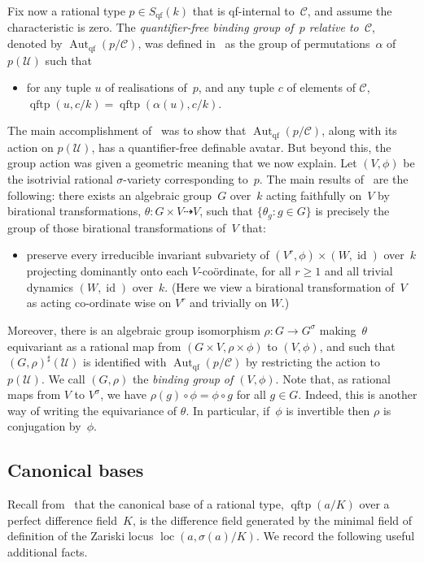 \documentclass[\DocOpts]{amsart}
\theoremstyle{definition}
\def\qftp{\operatorname{qftp}}
\def\qf{\operatorname{qf}}
\def\aut{\operatorname{Aut}}
\def\loc{\operatorname{loc}}
\def\C{\mathcal{C}}
\def\U{\mathcal{U}}
\providecommand{\id}{\operatorname{id}}
\newcommand{\ra}[1][]{\xrightarrow{#1}}
\newcommand{\shp}[1]{{#1}^\sharp}
\newcommand{\<}{\langle}
\renewcommand{\>}{\rangle}
\newcommand{\pp}[1]{(#1)}
\newcommand{\dto}{\dashrightarrow}
\begin{document}
Fix now a rational type $p\in S_{\qf}(k)$ that is qf-internal to~$\C$, and assume the characteristic is zero.
The {\em quantifier-free binding group of~$p$ relative to~$\C$}, denoted by $\aut_{\qf}(p/\C)$, was defined in~\cite{qfint} as the group of permutations~$\alpha$ of $p(\U)$ such that
\begin{itemize}
	\item[(A)] for any tuple \(u\) of realisations of~\(p\), and any tuple \(c\) of elements of \(\C\),
		\(\qftp(u,c/k)=\qftp(\alpha(u),c/k)\).
\end{itemize}
The main accomplishment of~\cite{qfint} was to show that $\aut_{\qf}(p/\C)$, along with its action on $p(\U)$, has a quantifier-free definable avatar.
But beyond this, the group action was given a geometric meaning that we now explain.
Let $\pp{V,\phi}$ be the isotrivial rational $\sigma$-variety corresponding to~$p$.
The main results of~\cite{qfint} are the following: there exists an algebraic group~$G$ over~$k$ acting faithfully on~$V$ by birational transformations, $\theta:G\times V\dto V$,
such that $\{\theta_g:g\in G\}$ is precisely the group of those birational transformations of~$V$ that:
\begin{itemize}
\item[(B)]
preserve every irreducible invariant subvariety of $(V^r,\phi)\times(W,\id)$ over~$k$ projecting dominantly onto each $V$-co\"ordinate, for all $r\geq 1$ and all trivial dynamics $(W,\id)$ over~$k$.
(Here we view a birational transformation of~$V$ as acting co-ordinate wise on $V^r$ and trivially on $W$.)
\end{itemize}
Moreover, there is
an algebraic group isomorphism 
\(\rho:G\ra{}G^\sigma\) making~$\theta$ equivariant as a rational map from $(G\times V,\rho\times\phi)$ to $(V,\phi)$, and such that 
\(\shp{\pp{G,\rho}}(\U)\) is identified with $\aut_{\qf}(p/\C)$ by restricting the action to $p(\U)$.
We call $(G,\rho)$ the {\em binding group of $(V,\phi)$}.
Note that, as rational maps from \(V\) to \(V^\sigma\), we have 
	\(\rho(g)\circ\phi=\phi\circ{}g\) for all \(g\in{}G\).
Indeed, this is another way of writing the equivariance of \(\theta\).
In particular, if~\(\phi\) is invertible then \(\rho\) is conjugation by~$\phi$.

\medskip
\subsection{Canonical bases}
Recall from~\cite[Lemma 2.5(b)]{qfint} that the canonical base of a rational type, $\qftp(a/K)$ over a perfect difference field~$K$, is the difference field generated by the minimal field of definition of the Zariski locus $\loc(a,\sigma(a)/K)$.
We record the following useful additional facts.
\end{document}
